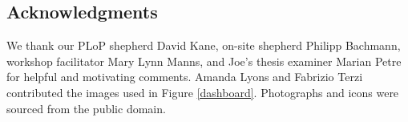 \subsection*{Acknowledgments}
We thank our PLoP shepherd David Kane, on-site shepherd Philipp
Bachmann, workshop facilitator Mary Lynn Manns, and Joe's thesis examiner
Marian Petre for
helpful and motivating comments.  Amanda Lyons and Fabrizio Terzi
contributed the images used in Figure \ref{dashboard}.  Photographs
and icons were sourced from the public domain.











